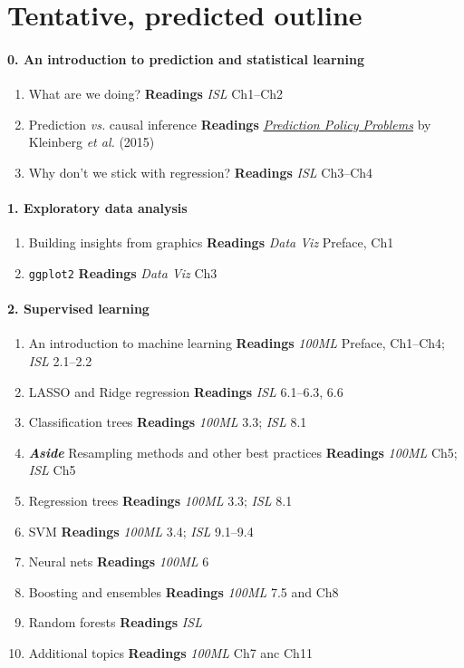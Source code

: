 \documentclass[10pt]{article}
\begin{document}
\newpage

\section*{Tentative, predicted outline}

\paragraph{0. An introduction to prediction and statistical learning}
\begin{enumerate}
  \item What are we doing? \textbf{Readings} \textit{ISL} Ch1--Ch2
  \item Prediction \textit{vs.} causal inference \textbf{Readings} \href{https://www.aeaweb.org/articles?id=10.1257/aer.p20151023}{\textit{Prediction Policy Problems}} by Kleinberg \textit{et al.} (2015)
  \item Why don't we stick with regression? \textbf{Readings} \textit{ISL} Ch3--Ch4
\end{enumerate}

\paragraph{1. Exploratory data analysis}
\begin{enumerate}
  \item Building insights from graphics \textbf{Readings} \textit{Data Viz} Preface, Ch1
  \item \texttt{ggplot2} \textbf{Readings} \textit{Data Viz} Ch3
\end{enumerate}

\paragraph{2. Supervised learning}
\begin{enumerate}
  \item An introduction to machine learning \textbf{Readings} \textit{100ML} Preface, Ch1--Ch4; \textit{ISL} 2.1--2.2
  \item LASSO and Ridge regression \textbf{Readings} \textit{ISL} 6.1--6.3, 6.6
  \item Classification trees \textbf{Readings} \textit{100ML} 3.3; \textit{ISL} 8.1
  \item \textbf{\textit{Aside}} Resampling methods and other best practices \textbf{Readings} \textit{100ML} Ch5; \textit{ISL} Ch5
  \item Regression trees \textbf{Readings} \textit{100ML} 3.3; \textit{ISL} 8.1
  \item SVM \textbf{Readings} \textit{100ML} 3.4; \textit{ISL} 9.1--9.4
  \item Neural nets \textbf{Readings} \textit{100ML} 6
  \item Boosting and ensembles \textbf{Readings} \textit{100ML} 7.5 and Ch8
  \item Random forests \textbf{Readings} \textit{ISL}
  \item Additional topics \textbf{Readings} \textit{100ML} Ch7 anc Ch11
\end{enumerate}
\end{document}
